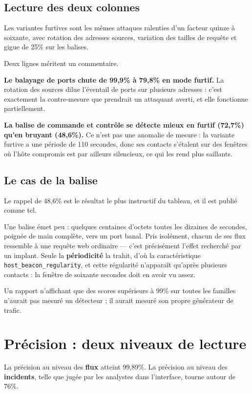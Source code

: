 \documentclass[11pt,a4paper]{article}
\begin{document}
\subsection{Lecture des deux colonnes}

Les variantes furtives sont les mêmes attaques ralenties d'un facteur quinze à soixante, avec
rotation des adresses sources, variation des tailles de requête et gigue de 25\% sur les balises.

Deux lignes méritent un commentaire.

\textbf{Le balayage de ports chute de 99,9\% à 79,8\% en mode furtif.} La rotation des sources
dilue l'éventail de ports sur plusieurs adresses : c'est exactement la contre-mesure que prendrait
un attaquant averti, et elle fonctionne partiellement.

\textbf{La balise de commande et contrôle se détecte mieux en furtif (72,7\%) qu'en bruyant
(48,6\%).} Ce n'est pas une anomalie de mesure : la variante furtive a une période de 110 secondes,
donc ses contacts s'étalent sur des fenêtres où l'hôte compromis est par ailleurs silencieux, ce qui
les rend plus saillants.

\subsection{Le cas de la balise}

Le rappel de 48,6\% est le résultat le plus instructif du tableau, et il est publié comme tel.

Une balise émet peu : quelques centaines d'octets toutes les dizaines de secondes, poignée de main
complète, vers un port banal. Pris isolément, chacun de ses flux ressemble à une requête web
ordinaire --- c'est précisément l'effet recherché par un implant. Seule la \textbf{périodicité} la
trahit, d'où la caractéristique \texttt{host\_beacon\_regularity}, et cette régularité n'apparaît
qu'après plusieurs contacts : la fenêtre de soixante secondes doit en avoir vu assez.

Un rapport n'affichant que des scores supérieurs à 99\% sur toutes les familles n'aurait pas mesuré
un détecteur ; il aurait mesuré son propre générateur de trafic.

\section{Précision : deux niveaux de lecture}

La précision au niveau des \textbf{flux} atteint 99,89\%. La précision au niveau des
\textbf{incidents}, telle que jugée par les analystes dans l'interface, tourne autour de 76\%.
\end{document}
